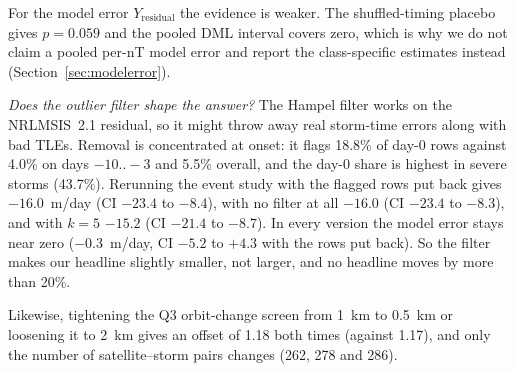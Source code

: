 For the model error $Y_{\text{residual}}$ the evidence is weaker. The shuffled-timing placebo
gives $p=0.059$ and the pooled DML interval covers zero, which is why we do not claim a pooled
per-nT model error and report the class-specific estimates instead
(Section~\ref{sec:modelerror}).

\textit{Does the outlier filter shape the answer?} The Hampel filter works on the NRLMSIS~2.1
residual, so it might throw away real storm-time errors along with bad TLEs. Removal is concentrated at onset: it flags 18.8\% of day-0 rows against
4.0\% on days $-10..-3$ and 5.5\% overall, and the day-0 share is highest in severe storms
(43.7\%). Rerunning the event study with the flagged rows put back gives $-16.0$~m/day (CI $-23.4$ to
$-8.4$), with no filter at all $-16.0$ (CI $-23.4$ to $-8.3$), and with $k=5$ $-15.2$ (CI $-21.4$
to $-8.7$). In every version the model error stays near zero ($-0.3$~m/day, CI $-5.2$ to $+4.3$ with
the rows put back). So the filter makes our headline slightly smaller, not larger,
and no headline moves by more than 20\%.

Likewise, tightening the Q3 orbit-change screen from 1~km to 0.5~km or loosening it to 2~km
gives an offset of 1.18 both times (against 1.17), and only the number of satellite--storm pairs
changes (262, 278 and 286).
